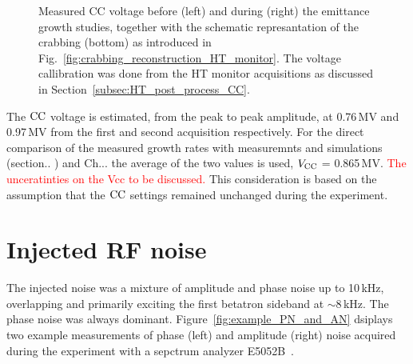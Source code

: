 \begin{figure}[!ht]
\begin{subfigure}[t]{0.45\textwidth}
    \end{subfigure}
    \hfill
     \caption{Measured CC voltage before (left) and during (right) the emittance growth studies, together with the schematic represantation of the crabbing (bottom) as introduced in Fig.~\ref{fig:crabbing_reconstruction_HT_monitor}. The voltage callibration was done from the HT monitor acquisitions as discussed in Section~\ref{subsec:HT_post_process_CC}. }
     \label{fig:VCC_MD5_2018} 
\end{figure}

\begin{sloppypar} %
The ${\mathrm{CC}}$ voltage is estimated, from the peak to peak amplitude, at 0.76\,MV and 0.97\,MV from the first and second acquisition respectively. For the direct comparison of the measured growth rates with measuremnts and simulations (section.. ) and Ch... the average of the two values is used, ${V_\mathrm{CC}}$ = 0.865\,MV. \textcolor{red}{The unceratinties on the Vcc to be discussed.} This consideration is based on the assumption that the ${\mathrm{CC}}$ settings remained unchanged during the experiment.
\end{sloppypar} 

\section{Injected RF noise}\label{sec:noise_meas2018}
\begin{sloppypar} %
 The injected noise was a mixture of amplitude and phase noise up to 10\,kHz, overlapping and primarily exciting the first betatron sideband at $\sim 8$\,kHz. The phase noise was always dominant. Figure~\ref{fig:example_PN_and_AN} dsiplays two example measurements of phase (left) and amplitude (right) noise acquired during the experiment with a sepctrum analyzer E5052B~\cite{E5052B_insight}. 
\end{sloppypar} 

